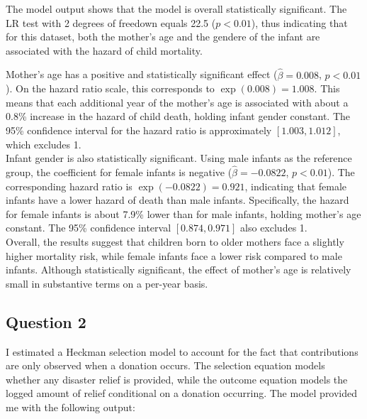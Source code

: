 \documentclass[12pt,letterpaper]{article}
\begin{document}
The model output shows that the model is overall statistically significant. The LR test with 2 degrees of freedown equals 22.5 (\(p < 0.01\)), thus indicating that for this dataset, both the mother's age and the gendere of the infant are associated with the hazard of child mortality.

Mother's age has a positive and statistically significant effect (\(\hat{\beta} = 0.008\), \(p < 0.01\)). On the hazard ratio scale, this corresponds to \(\exp(0.008) = 1.008\). This means that each additional year of the mother's age is associated with about a 0.8\% increase in the hazard of child death, holding infant gender constant. The 95\% confidence interval for the hazard ratio is approximately \([1.003, 1.012]\), which excludes 1.\\

Infant gender is also statistically significant. Using male infants as the reference group, the coefficient for female infants is negative (\(\hat{\beta} = -0.0822\), \(p < 0.01\)). The corresponding hazard ratio is \(\exp(-0.0822) = 0.921\), indicating that female infants have a lower hazard of death than male infants. Specifically, the hazard for female infants is about 7.9\% lower than for male infants, holding mother's age constant. The 95\% confidence interval \([0.874, 0.971]\) also excludes 1.\\

Overall, the results suggest that children born to older mothers face a slightly higher mortality risk, while female infants face a lower risk compared to male infants. Although statistically significant, the effect of mother's age is relatively small in substantive terms on a per-year basis.\\

\subsection*{Question 2}

 I estimated a Heckman selection model to account for the fact that contributions are only observed when a donation occurs. The selection equation models whether any disaster relief is provided, while the outcome equation models the logged amount of relief conditional on a donation occurring. The model provided me with the following output: 
 
\end{document}
